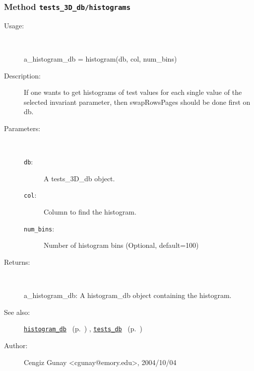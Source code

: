 \subsubsection[Method \texttt{histograms}]{Method \texttt{tests\_3D\_db/histograms}}%
%
\label{ref_tests_3D_db__histograms}%
\hypertarget{ref_tests_3D_db__histograms}{}%
\begin{description}
%
\item[Usage:]~%
\begin{lyxcode}%
a\_histogram\_db = histogram(db, col, num\_bins)
%
\end{lyxcode}%
%
\item[Description:]%
If one wants to get histograms of test values for each single value of
 the selected invariant parameter, then swapRowsPages should be done
 first on db.
\item[Parameters:]~
\begin{description}%
\item[\texttt{db}:]
 A tests\_3D\_db object.
\item[\texttt{col}:]
 Column to find the histogram.
\item[\texttt{num\_bins}:]
 Number of histogram bins (Optional, default=100)
\end{description}%
%
\item[Returns:]~

	a\_histogram\_db: A histogram\_db object containing the histogram.
%
%
\item[See also:]%
\hyperlink{ref_histogram_db}{\texttt{histogram\_db}}%
\ (p.~\pageref{ref_histogram_db})%
%
, \hyperlink{ref_tests_db}{\texttt{tests\_db}}%
\ (p.~\pageref{ref_tests_db})%
%
%
\item[Author:]%
Cengiz Gunay <cgunay@emory.edu>, 2004/10/04%
\end{description}
\methodline%
